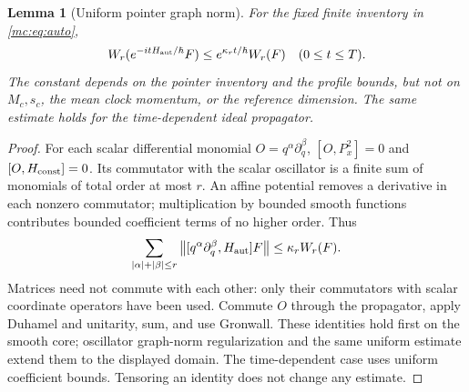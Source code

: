 \documentclass[11pt,oneside,openany]{book}
\newtheorem{lemma}[theorem]{Lemma}
\theoremstyle{definition}
\theoremstyle{remark}\newtheorem{remark}[theorem]{Remark}
\providecommand{\norm}[1]{\left\lVert#1\right\rVert}
\begin{document}
\begin{lemma}[Uniform pointer graph norm]\label{mc:lem:graph}
For the fixed finite inventory in \eqref{mc:eq:auto},
\begin{equation}\label{mc:eq:graph}
 W_r(e^{-itH_{\rm aut}/\hbar}F)\le e^{\kappa_rt/\hbar}W_r(F)
 \quad(0\le t\le T).
\end{equation}
The constant depends on the pointer inventory and the profile bounds, but not on $M_c,s_c$, the mean clock momentum, or the reference dimension. The same estimate holds for the time-dependent ideal propagator.
\end{lemma}
\begin{proof}
For each scalar differential monomial $O=q^\alpha\partial_q^\beta$, $[O,P_x^2]=0$ and $[O,H_{\rm const}]=0$. Its commutator with the scalar oscillator is a finite sum of monomials of total order at most $r$. An affine potential removes a derivative in each nonzero commutator; multiplication by bounded smooth functions contributes bounded coefficient terms of no higher order. Thus
\[
 \sum_{|\alpha|+|\beta|\le r}\norm{[q^\alpha\partial_q^\beta,H_{\rm aut}]F}
 \le \kappa_rW_r(F).
\]
Matrices need not commute with each other: only their commutators with scalar coordinate operators have been used. Commute $O$ through the propagator, apply Duhamel and unitarity, sum, and use Gronwall. These identities hold first on the smooth core; oscillator graph-norm regularization and the same uniform estimate extend them to the displayed domain. The time-dependent case uses uniform coefficient bounds. Tensoring an identity does not change any estimate.
\end{proof}
\end{document}
